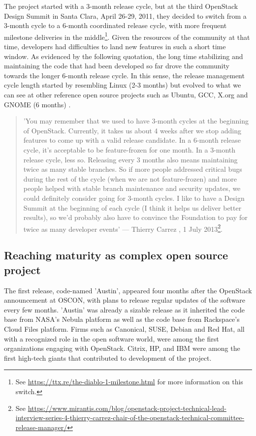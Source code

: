 \documentclass[dvipsnames]{interact}
\theoremstyle{plain}\newtheorem{theorem}{Theorem}[section]
\theoremstyle{definition}
\theoremstyle{remark}
\begin{document}
The project started with a 3-month release cycle, but at the third OpenStack Design Summit in Santa Clara, April 26-29, 2011, they decided to switch from a 3-month cycle to a 6-month coordinated release cycle, with more frequent milestone deliveries in the middle\footnote{See \url{ https://ttx.re/the-diablo-1-milestone.html} for more information on this switch.}. Given the resources of the community at that time, developers had difficulties to land new features in such a short time window. As evidenced by the following quotation, the long time stabilizing and maintaining the code that had been developed so far drove the community towards the longer 6-month release cycle. In this sense, the release management cycle length started by resembling Linux (2-3 months) but evolved to what we can see at other reference open source projects such as Ubuntu, GCC, X.org and GNOME (6 months) \cite{MichlmayrFitzgerald_et_al2015}.

 
\begin{quotation}
\footnotesize 
'You may remember that we used to have 3-month cycles at the beginning of OpenStack. Currently, it takes us about 4 weeks after we stop adding features to come up with a valid release candidate. In a 6-month release cycle, it’s acceptable to be feature-frozen for one month. In a 3-month release cycle, less so. Releasing every 3 months also means maintaining twice as many stable branches. So if more people addressed critical bugs during the rest of the cycle (when we are not feature-frozen) and more people helped with stable branch maintenance and security updates, we could definitely consider going for 3-month cycles. I like to have a Design Summit at the beginning of each cycle (I think it helps us deliver better results), so we’d probably also have to convince the Foundation to pay for twice as many developer events' --- Thierry Carrez , 1 July 2013\footnote{See \url{https://www.mirantis.com/blog/openstack-project-technical-lead-interview-series-4-thierry-carrez-chair-of-the-openstack-technical-committee-release-manager/}}. 
\end{quotation}



\subsection{Reaching maturity as complex open source project}

The first release, code-named 'Austin', appeared four months after the OpenStack announcement at OSCON, with plans to release regular updates of the software every few months. 'Austin' was already a sizable release as it inherited the code base from NASA's Nebula platform as well as the code base from Rackspace's Cloud Files platform.  Firms such as Canonical, SUSE, Debian and  Red Hat, all with a recognized role in the open software world, were among the first organizations engaging with OpenStack. Citrix, HP, and IBM were among the first high-tech giants that contributed to development of the project. 
\end{document}
